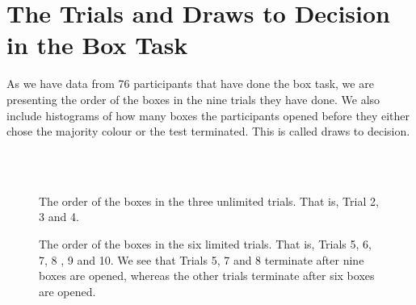 \appendix
\chapter[Trials and Draws To Decision]{The Trials and Draws to Decision in the Box Task}
\label{appendix_a}

As we have data from 76 participants that have done the box task, we are presenting the order of the boxes in the nine trials they have done. We also include histograms of how many boxes the participants opened before they either chose the majority colour or the test terminated. This is called draws to decision. 

\begin{figure}
    \centering
    \scalebox{0.8}{}\\
    \vspace{0.1cm}
    \scalebox{0.8}{}\\
    \vspace{0.1cm}
    \scalebox{0.8}{}
    \caption[Order of boxes in the unlimited trials]{The order of the boxes in the three unlimited trials. That is, Trial 2, 3 and 4.}
    \label{fig:unlimited_trials_order}
\end{figure}

\begin{figure}
    \centering
    \scalebox{0.8}{}
    \caption[Order of the boxes in the limited trials]{The order of the boxes in the six limited trials. That is, Trials 5, 6, 7, 8 , 9 and 10. We see that Trials 5, 7 and 8 terminate after nine boxes are opened, whereas the other trials terminate after six boxes are opened.}
    \label{fig:all_limited_trials_order}
\end{figure}

